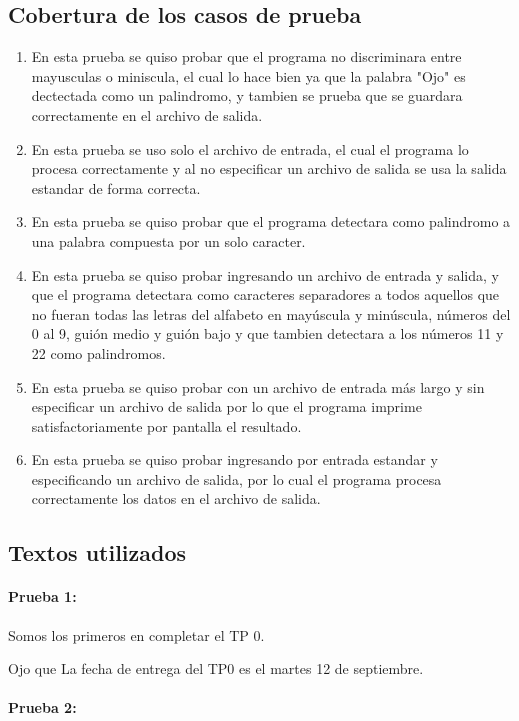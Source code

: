 \documentclass[a4paper]{article}
\begin{document}
\pagebreak

\subsection{Cobertura de los casos de prueba}
\begin{enumerate}
\item En esta prueba se quiso probar que el programa no discriminara entre mayusculas o miniscula, el cual lo hace bien ya que la palabra "Ojo" es dectectada como un palindromo, y tambien se prueba que se guardara correctamente en el archivo de salida.
\item En esta prueba se uso solo el archivo de entrada, el cual el programa lo procesa correctamente  y al no especificar un archivo de salida se usa la salida estandar de forma correcta. 
\item En esta prueba se quiso probar que el programa detectara como palindromo a una palabra compuesta por un solo caracter.
\item En esta prueba se quiso probar ingresando un archivo de entrada y salida, y que el programa detectara como caracteres separadores a todos aquellos que no fueran todas las letras del alfabeto en mayúscula y minúscula, números del 0 al 9, guión medio y guión bajo y que tambien detectara a los números 11 y 22 como palindromos.
\item En esta prueba se quiso probar con un archivo de entrada más largo y sin especificar un archivo de salida por lo que el programa imprime satisfactoriamente por pantalla el resultado.
\item En esta prueba se quiso probar ingresando por entrada estandar y especificando un archivo de salida, por lo cual el programa procesa correctamente los datos en el archivo de salida.
\end{enumerate}

\subsection{Textos utilizados}

\paragraph{Prueba 1:}

Somos los primeros en completar el TP 0.

Ojo que La fecha de entrega del TP0 es el martes 12 de septiembre.

\paragraph{Prueba 2:}
\end{document}
